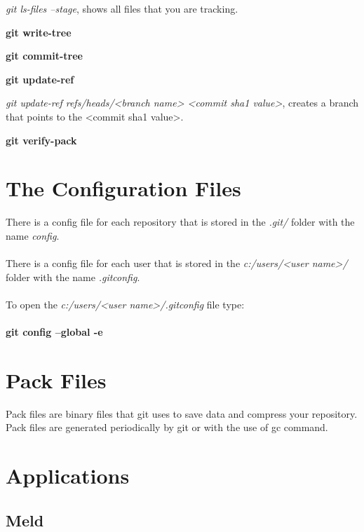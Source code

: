 \emph{git ls-files --stage}, shows all files that you are tracking.

\noindent \textbf{git write-tree}

\noindent \textbf{git commit-tree}

\noindent \textbf{git update-ref}

\emph{git update-ref refs/heads/<branch name> <commit sha1 value>}, creates a branch that points to the <commit sha1 value>.

\noindent \textbf{git verify-pack}

\section{The Configuration Files}

There is a config file for each repository that is stored in the \emph{.git/} folder with the name \emph{config}.\\
\\
There is a config file for each user that is stored in the \emph{c:/users/<user name>/} folder with the name \emph{.gitconfig}.\\
\\
To open the \emph{c:/users/<user name>/.gitconfig} file type:\\
\\
\textbf{git config --global -e}

\section{Pack Files}

Pack files are binary files that git uses to save data and compress your repository. Pack files are generated periodically by git or with the use of gc command.

\section{Applications}

\subsection{Meld}

%
%
%	
%
%
%
%

